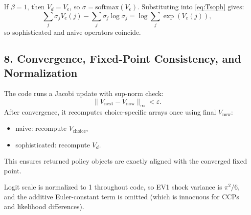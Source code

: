 \documentclass[a4paper, 11pt]{article}
\begin{document}
\noindent If \(\beta=1\), then \(V_d=V_e\), so \(\sigma=\text{softmax}(V_e)\).
Substituting into \eqref{eq:Tsoph} gives:
\[
\sum_j \sigma_j V_e(j)-\sum_j \sigma_j\log\sigma_j
= \log\sum_j \exp(V_e(j)),
\]
so sophisticated and naive operators coincide.

\subsection*{8. Convergence, Fixed-Point Consistency, and Normalization}

\noindent The code runs a Jacobi update with sup-norm check:
\[
\|V_{\text{next}}-V_{\text{now}}\|_\infty < \varepsilon.
\]
After convergence, it recomputes choice-specific arrays once using final \(V_{\text{now}}\):
\begin{itemize}
    \item naive: recompute \(V_{\text{choice}}\),
    \item sophisticated: recompute \(V_d\).
\end{itemize}
This ensures returned policy objects are exactly aligned with the converged fixed point.

\noindent Logit scale is normalized to 1 throughout code, so EV1 shock variance is \(\pi^2/6\), and the additive Euler-constant term is omitted (which is innocuous for CCPs and likelihood differences).
\end{document}
